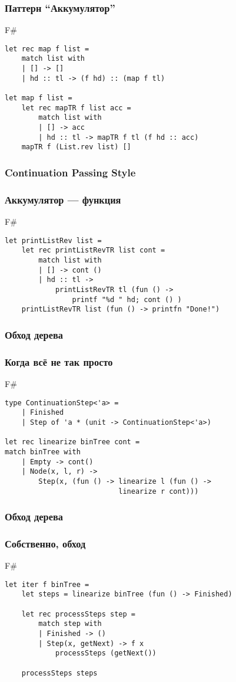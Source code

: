 \documentclass[xetex,mathserif,serif]{beamer}
\begin{document}
\begin{frame}[fragile]
	\frametitle{Паттерн ``Аккумулятор''}
	\begin{exampleblock}{F\#}
		\begin{lstlisting}
let rec map f list =
    match list with
    | [] -> []
    | hd :: tl -> (f hd) :: (map f tl)

let map f list =
    let rec mapTR f list acc =
        match list with
        | [] -> acc
        | hd :: tl -> mapTR f tl (f hd :: acc)
    mapTR f (List.rev list) []
\end{lstlisting}
\end{exampleblock}
	
\end{frame}

\begin{frame}[fragile]
	\frametitle{Continuation Passing Style}
	\frametitle{Аккумулятор --- функция}
	\begin{exampleblock}{F\#}
		\begin{lstlisting}
let printListRev list =
    let rec printListRevTR list cont =
        match list with
        | [] -> cont ()
        | hd :: tl ->
            printListRevTR tl (fun () -> 
                printf "%d " hd; cont () )
    printListRevTR list (fun () -> printfn "Done!")
\end{lstlisting}
\end{exampleblock}
	
\end{frame}

\begin{frame}[fragile]
	\frametitle{Обход дерева}
	\frametitle{Когда всё не так просто}
	\begin{exampleblock}{F\#}
		\begin{lstlisting}
type ContinuationStep<'a> =
    | Finished
    | Step of 'a * (unit -> ContinuationStep<'a>)
    
let rec linearize binTree cont =
match binTree with
    | Empty -> cont()
    | Node(x, l, r) ->
        Step(x, (fun () -> linearize l (fun () -> 
                           linearize r cont)))
\end{lstlisting}
\end{exampleblock}
	
\end{frame}

\begin{frame}[fragile]
	\frametitle{Обход дерева}
	\frametitle{Собственно, обход}
	\begin{exampleblock}{F\#}
		\begin{lstlisting}
let iter f binTree =
    let steps = linearize binTree (fun () -> Finished)

    let rec processSteps step =
        match step with
        | Finished -> ()
        | Step(x, getNext) -> f x
            processSteps (getNext())
    
    processSteps steps
\end{lstlisting}
\end{exampleblock}
	
\end{frame}
\end{document}
